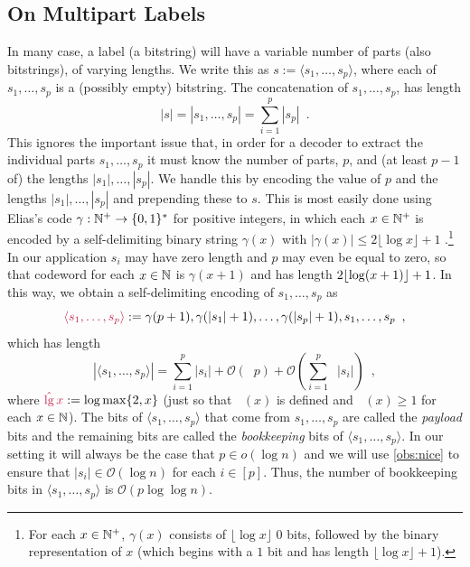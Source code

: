 \documentclass{patmorin}
\makeatletter
\renewcommand{\ge}{\geqslant}
\renewcommand{\le}{\leqslant}
\newcommand{\defin}[1]{\emph{\textcolor{brightmaroon}{#1}}}
\def\mathcolor#1#{\@mathcolor{#1}}
\def\@mathcolor#1#2#3{%
  \protect\leavevmode
  \begingroup
    \color#1{#2}#3%
  \endgroup
}
\newcommand{\mathdefin}[1]{\mathcolor{brightmaroon}{#1}}
\DeclareMathOperator{\lgg}{\hat{lg}}
\newcommand{\Oh}{\mathcal{O}}
\makeatother
\begin{document}
  \subsection{On Multipart Labels}
  \label{multipart}

  In many case, a label (a bitstring) will have a variable number of parts (also bitstrings), of varying lengths.  We write this as $s:=\langle s_1,\ldots,s_p\rangle$, where each of $s_1,\ldots,s_p$ is a (possibly empty) bitstring.  The concatenation of $s_1,\ldots,s_p$, has length
  \[
     \textstyle |s|=|s_1,\ldots,s_p|=\sum_{i=1}^p|s_p| \enspace .
  \]
  This ignores the important issue that, in order for a decoder to extract the individual parts $s_1,\ldots,s_p$ it must know the number of parts, $p$, and (at least $p-1$ of) the lengths $|s_1|,\ldots,|s_p|$.  We handle this by encoding the value of $p$ and the lengths $|s_1|,\ldots,|s_{p}|$ and prepending these to $s$. This is most easily done using Elias's code $\gamma:\mathbb{N}^+\to\{0,1\}^*$ for positive integers, in which each $x\in\mathbb{N}^+$ is encoded by a self-delimiting binary string $\gamma(x)$ with $|\gamma(x)|\le 2\lfloor \log x  \rfloor  + 1$ \cite{elias:universal}.\footnote{For each $x\in\mathbb{N}^+$, $\gamma(x)$ consists of $\lfloor\log x\rfloor$ 0 bits, followed by the binary representation of $x$ (which begins with a $1$ bit and has length $\lfloor\log x\rfloor+1$).} In our application $s_i$ may have zero length and $p$ may even be equal to zero, so that codeword for each $x\in\mathbb{N}$ is $\gamma(x+1)$ and has length $2{\lfloor \log (x+1) \rfloor}+1$.
  In this way, we obtain a self-delimiting encoding of $s_1,\ldots,s_p$ as
  \[  \mathdefin{\langle s_1,\ldots,s_p\rangle}:=\gamma(p+1),\gamma(|s_1|+1),\ldots,\gamma(|s_p|+1),s_1,\ldots,s_p \enspace ,
  \]
  which has length
  \begin{equation}
    |\langle s_1,\ldots,s_p\rangle| = \textstyle\sum_{i=1}^p|s_i|+\Oh(\lgg p) + \Oh(\sum_{i=1}^p\lgg|s_i|) \enspace , \label{encoding_cost}
  \end{equation}
  where $\mathdefin{\lgg x} := \log\max\{2,x\}$ (just so that $\lgg(x)$ is defined and $\lgg(x)\ge 1$ for each $x\in\mathbb{N}$).    The bits of $\langle s_1,\ldots,s_p\rangle$ that come from $s_1,\ldots,s_p$ are called the \defin{payload} bits and the remaining bits are called the \defin{bookkeeping} bits of $\langle s_1,\ldots,s_p\rangle$.
  In our setting it will always be the case that $p\in o(\log n)$ and we will use \cref{obs:nice} to ensure that $|s_i|\in \Oh(\log n)$ for each $i\in[p]$.
  Thus, the number of bookkeeping bits in $\langle s_1,\ldots,s_p\rangle$  is $\Oh(p\log\log n)$.
\end{document}
